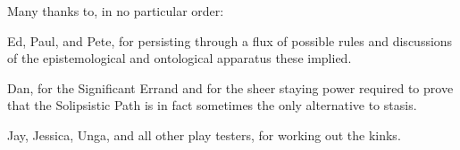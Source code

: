 
Many thanks to, in no particular order:

Ed, Paul, and Pete, for persisting through a flux of possible rules
and discussions of the epistemological and ontological apparatus
these implied.

Dan, for the Significant Errand and for the sheer staying power
required to prove that the Solipsistic Path is in fact sometimes
the only alternative to stasis.

Jay, Jessica, Unga, and all other play testers, for working out
the kinks.

%

